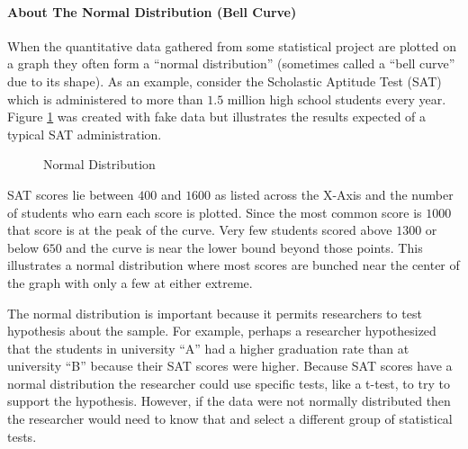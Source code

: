 \paragraph{About The Normal Distribution (Bell Curve)}\label{int:normal_distribution}

When the quantitative data gathered from some statistical project are plotted on a graph they often form a ``normal distribution'' (sometimes called a ``bell curve'' due to its shape). As an example, consider the Scholastic Aptitude Test (SAT) which is administered to more than $ 1.5 $ million high school students every year. Figure \ref{lab01_fig01} was created with fake data but illustrates the results expected of a typical SAT administration.

\begin{figure}[H]
  \begin{center}
    \caption{Normal Distribution}
    \label{lab01_fig01}
  \end{center}
\end{figure}

SAT scores lie between $ 400 $ and $ 1600 $ as listed across the X-Axis and the number of students who earn each score is plotted. Since the most common score is $ 1000 $ that score is at the peak of the curve. Very few students scored above $ 1300 $ or below $ 650 $ and the curve is near the lower bound beyond those points. This illustrates a normal distribution where most scores are bunched near the center of the graph with only a few at either extreme.

The normal distribution is important because it permits researchers to test hypothesis about the sample. For example, perhaps a researcher hypothesized that the students in university ``A'' had a higher graduation rate than at university ``B'' because their SAT scores were higher. Because SAT scores have a normal distribution the researcher could use specific tests, like a t-test, to try to support the hypothesis. However, if the data were not normally distributed then the researcher would need to know that and select a different group of statistical tests.

